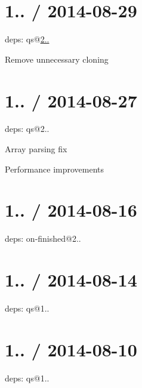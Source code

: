 \section*{1.. / 2014-\/08-\/29 }


\begin{DoxyItemize}
\item deps\+: qs@\hyperlink{namespace2_1_12_1_12}{2..}
\begin{DoxyItemize}
\item Remove unnecessary cloning
\end{DoxyItemize}
\end{DoxyItemize}

\section*{1.. / 2014-\/08-\/27 }


\begin{DoxyItemize}
\item deps\+: qs@2..
\begin{DoxyItemize}
\item Array parsing fix
\item Performance improvements
\end{DoxyItemize}
\end{DoxyItemize}

\section*{1.. / 2014-\/08-\/16 }


\begin{DoxyItemize}
\item deps\+: on-\/finished@2..
\end{DoxyItemize}

\section*{1.. / 2014-\/08-\/14 }


\begin{DoxyItemize}
\item deps\+: qs@1..
\end{DoxyItemize}

\section*{1.. / 2014-\/08-\/10 }


\begin{DoxyItemize}
\item deps\+: qs@1..
\end{DoxyItemize}

